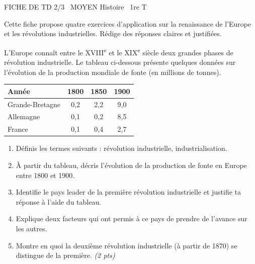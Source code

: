 \documentclass[11pt]{article}
\begin{document}
\begin{tcolorbox}[enhanced,colback=popink,colframe=popink,arc=10pt,boxrule=0pt,left=12pt,right=12pt,top=9pt,bottom=9pt]
{\color{white}\popxbold\small FICHE DE TD 2/3 \textbullet\ MOYEN \hfill Histoire \textbullet\ 1re T\par}
\end{tcolorbox}
\vspace{4pt}
Cette fiche propose quatre exercices d'application sur la renaissance de l'Europe et les révolutions industrielles. Rédige des réponses claires et justifiées.

\begin{exercice}
L'Europe connaît entre le XVIII\textsuperscript{e} et le XIX\textsuperscript{e} siècle deux grandes phases de révolution industrielle. Le tableau ci-dessous présente quelques données sur l'évolution de la production mondiale de fonte (en millions de tonnes).

\begin{center}
\begin{tabular}{|l|c|c|c|}
\hline
\textbf{Année} & 1800 & 1850 & 1900 \\
\hline
Grande-Bretagne & 0,2 & 2,2 & 9,0 \\
\hline
Allemagne & 0,1 & 0,2 & 8,5 \\
\hline
France & 0,1 & 0,4 & 2,7 \\
\hline
\end{tabular}
\end{center}

\begin{enumerate}
\item Définis les termes suivants : révolution industrielle, industrialisation.
\item À partir du tableau, décris l'évolution de la production de fonte en Europe entre 1800 et 1900.
\item Identifie le pays leader de la première révolution industrielle et justifie ta réponse à l'aide du tableau.
\item Explique deux facteurs qui ont permis à ce pays de prendre de l'avance sur les autres.
\item Montre en quoi la deuxième révolution industrielle (à partir de 1870) se distingue de la première. \textit{(2 pts)}
\end{enumerate}
\end{exercice}
\end{document}
